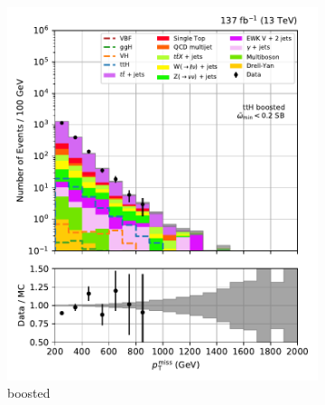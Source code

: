 \begin{figure}[htbp]
    \centering
    \begin{subfigure}[b]{0.24\textwidth}
        \includegraphics[width=\textwidth]{figures/region_plots/full_Run2/sideband_3/ttH_boosted.pdf}
        \caption{\ttH boosted}
    \end{subfigure}
    \hfill
    \begin{subfigure}[b]{0.24\textwidth}

\end{subfigure}
\end{figure}
